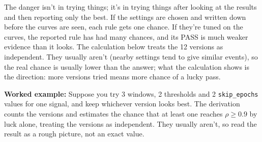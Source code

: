 \documentclass[11pt,a4paper,oneside,openany]{report}
\newcommand{\code}[1]{\texttt{#1}}
\newcommand{\fex}{\par\textbf{Worked example:} }
\begin{document}
The danger isn't in trying things; it's in trying things after looking at the results and then reporting only the best. If the settings are chosen and written down before the curves are seen, each rule gets one chance. If they're tuned on the curves, the reported rule has had many chances, and its PASS is much weaker evidence than it looks. The calculation below treats the 12 versions as independent. They usually aren't (nearby settings tend to give similar events), so the real chance is usually lower than the answer; what the calculation shows is the direction: more versions tried means more chance of a lucky pass.

\fex Suppose you try 3 windows, 2 thresholds and 2 \code{skip\_\allowbreak{}epochs} values for one signal, and keep whichever version looks best. The derivation counts the versions and estimates the chance that at least one reaches $\rho \ge 0.9$ by luck alone, treating the versions as independent. They usually aren't, so read the result as a rough picture, not an exact value.
\end{document}
